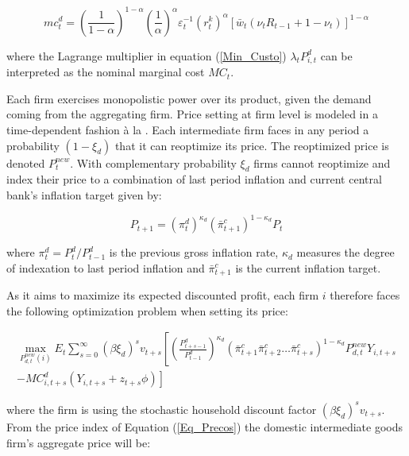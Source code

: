\documentclass[12pt,oneside,a4paper]{article}
\begin{document}
\begin{equation}
m c_{t}^{d}=\left(\frac{1}{1-\alpha}\right)^{1-\alpha} \left(\frac{1}{\alpha}\right)^{\alpha}\varepsilon_{t}^{-1}\left(r_{t}^{k}\right)^{\alpha}\left[\bar{w}_{t}\left(\nu_{t} R_{t-1}+1-\nu_{t}\right)\right]^{1-\alpha} 
\end{equation}


where the Lagrange multiplier in equation (\ref{Min_Custo}) $\lambda_t P_{i,t}^{d}$ can be interpreted as the nominal marginal cost $MC_t$.

Each firm exercises monopolistic power over its product, given the demand coming from the aggregating firm. Price setting at firm level is modeled in a time-dependent fashion à la \citet{Calvo:1983}. Each intermediate firm faces in any period a probability $(1-\xi_d)$ that it can reoptimize its price. The reoptimized price is denoted $P_t^{new}$. With complementary probability $\xi_d$ firms cannot reoptimize and index their price to a combination of last period inflation and current central bank’s inflation target given by:

\begin{equation}
    P_{t+1}=\left(\pi_{t}^{d}\right)^{\kappa_{d}}\left(\bar{\pi}_{t+1}^{c}\right)^{1-\kappa_{d}} P_{t}     
\end{equation}

where $\pi_{t}^{d} = P_t^{d}/P_{t-1}^{d}$ is the previous gross inflation rate, $\kappa_{d}$ measures the degree of indexation to last period inflation and $\bar{\pi}_{t+1}^{c}$ is the current inflation target.

As it aims to maximize its expected discounted profit, each firm $i$ therefore faces the following optimization problem when setting its price:

\begin{equation}
\label{Max_lucro_firma_domestica}
\begin{array}{c}
\max _{P_{d, t}^{new}(i)} E_{t} \sum_{s=0}^{\infty}\left(\beta \xi_{d}\right)^{s} v_{t+s}\left[\left(\frac{P_{t+s-1}^{d}}{P_{t-1}^{d}}\right)^{\kappa_{d}}\left(\bar{\pi}_{t+1}^{c} \bar{\pi}_{t+2}^{c} \ldots \bar{\pi}_{t+s}^{c}\right)^{1-\kappa_{d}} P_{d, t}^{new} Y_{i, t+s}\right. \\
\left.-M C_{i, t+s}^{d}\left(Y_{i, t+s}+z_{t+s} \phi\right)\right]
\end{array}
\end{equation}

where the firm is using the stochastic household discount factor $\left(\beta \xi_{d}\right)^{s} v_{t+s}$. From the price index of Equation  (\ref{Eq_Precos}) the domestic
intermediate goods firm's aggregate price will be:
\end{document}
